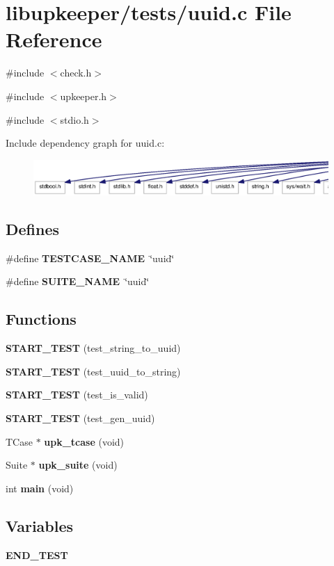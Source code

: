 \section{libupkeeper/tests/uuid.c File Reference}
\label{tests_2uuid_8c}
{\ttfamily \#include $<$check.h$>$}\par
{\ttfamily \#include $<$upkeeper.h$>$}\par
{\ttfamily \#include $<$stdio.h$>$}\par
Include dependency graph for uuid.c:\nopagebreak
\begin{figure}[H]
\begin{center}
\leavevmode
\includegraphics[width=400pt]{tests_2uuid_8c__incl}
\end{center}
\end{figure}
\subsection*{Defines}
\begin{DoxyCompactItemize}
\item 
\#define {\bf TESTCASE\_\-NAME}~\char`\"{}uuid\char`\"{}
\item 
\#define {\bf SUITE\_\-NAME}~\char`\"{}uuid\char`\"{}
\end{DoxyCompactItemize}
\subsection*{Functions}
\begin{DoxyCompactItemize}
\item 
{\bf START\_\-TEST} (test\_\-string\_\-to\_\-uuid)
\item 
{\bf START\_\-TEST} (test\_\-uuid\_\-to\_\-string)
\item 
{\bf START\_\-TEST} (test\_\-is\_\-valid)
\item 
{\bf START\_\-TEST} (test\_\-gen\_\-uuid)
\item 
TCase $\ast$ {\bf upk\_\-tcase} (void)
\item 
Suite $\ast$ {\bf upk\_\-suite} (void)
\item 
int {\bf main} (void)
\end{DoxyCompactItemize}
\subsection*{Variables}
\begin{DoxyCompactItemize}
\item 
{\bf END\_\-TEST}
\end{DoxyCompactItemize}


